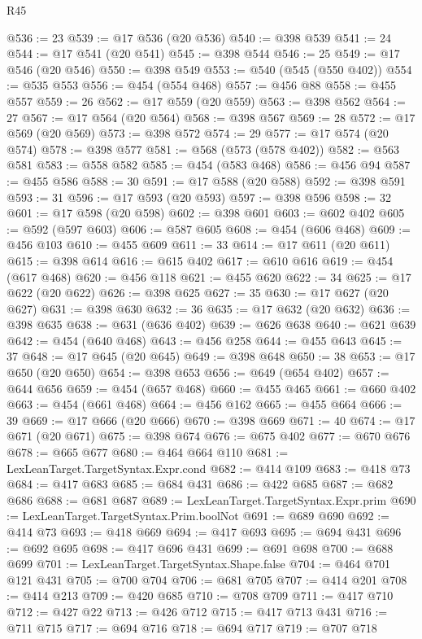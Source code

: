 \begin{lexlean}{R45}
\begin{coremodule}
@536 := 23
@539 := @17 @536 (@20 @536)
@540 := @398 @539
@541 := 24
@544 := @17 @541 (@20 @541)
@545 := @398 @544
@546 := 25
@549 := @17 @546 (@20 @546)
@550 := @398 @549
@553 := @540 (@545 (@550 @402))
@554 := @535 @553
@556 := @454 (@554 @468)
@557 := @456 @88
@558 := @455 @557
@559 := 26
@562 := @17 @559 (@20 @559)
@563 := @398 @562
@564 := 27
@567 := @17 @564 (@20 @564)
@568 := @398 @567
@569 := 28
@572 := @17 @569 (@20 @569)
@573 := @398 @572
@574 := 29
@577 := @17 @574 (@20 @574)
@578 := @398 @577
@581 := @568 (@573 (@578 @402))
@582 := @563 @581
@583 := @558 @582
@585 := @454 (@583 @468)
@586 := @456 @94
@587 := @455 @586
@588 := 30
@591 := @17 @588 (@20 @588)
@592 := @398 @591
@593 := 31
@596 := @17 @593 (@20 @593)
@597 := @398 @596
@598 := 32
@601 := @17 @598 (@20 @598)
@602 := @398 @601
@603 := @602 @402
@605 := @592 (@597 @603)
@606 := @587 @605
@608 := @454 (@606 @468)
@609 := @456 @103
@610 := @455 @609
@611 := 33
@614 := @17 @611 (@20 @611)
@615 := @398 @614
@616 := @615 @402
@617 := @610 @616
@619 := @454 (@617 @468)
@620 := @456 @118
@621 := @455 @620
@622 := 34
@625 := @17 @622 (@20 @622)
@626 := @398 @625
@627 := 35
@630 := @17 @627 (@20 @627)
@631 := @398 @630
@632 := 36
@635 := @17 @632 (@20 @632)
@636 := @398 @635
@638 := @631 (@636 @402)
@639 := @626 @638
@640 := @621 @639
@642 := @454 (@640 @468)
@643 := @456 @258
@644 := @455 @643
@645 := 37
@648 := @17 @645 (@20 @645)
@649 := @398 @648
@650 := 38
@653 := @17 @650 (@20 @650)
@654 := @398 @653
@656 := @649 (@654 @402)
@657 := @644 @656
@659 := @454 (@657 @468)
@660 := @455 @465
@661 := @660 @402
@663 := @454 (@661 @468)
@664 := @456 @162
@665 := @455 @664
@666 := 39
@669 := @17 @666 (@20 @666)
@670 := @398 @669
@671 := 40
@674 := @17 @671 (@20 @671)
@675 := @398 @674
@676 := @675 @402
@677 := @670 @676
@678 := @665 @677
@680 := @464 @664 @110
@681 := LexLeanTarget.TargetSyntax.Expr.cond
@682 := @414 @109
@683 := @418 @73
@684 := @417 @683
@685 := @684 @431
@686 := @422 @685
@687 := @682 @686
@688 := @681 @687
@689 := LexLeanTarget.TargetSyntax.Expr.prim
@690 := LexLeanTarget.TargetSyntax.Prim.boolNot
@691 := @689 @690
@692 := @414 @73
@693 := @418 @669
@694 := @417 @693
@695 := @694 @431
@696 := @692 @695
@698 := @417 @696 @431
@699 := @691 @698
@700 := @688 @699
@701 := LexLeanTarget.TargetSyntax.Shape.false
@704 := @464 @701 @121 @431
@705 := @700 @704
@706 := @681 @705
@707 := @414 @201
@708 := @414 @213
@709 := @420 @685
@710 := @708 @709
@711 := @417 @710
@712 := @427 @22
@713 := @426 @712
@715 := @417 @713 @431
@716 := @711 @715
@717 := @694 @716
@718 := @694 @717
@719 := @707 @718

\end{coremodule}
\end{lexlean}
